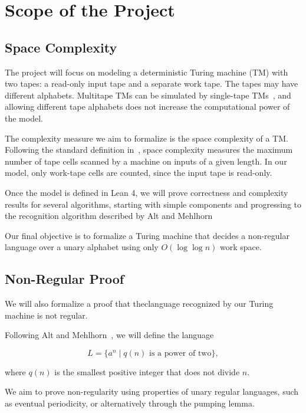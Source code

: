 \documentclass[UTF8]{article}
\begin{document}

\section{Scope of the Project}


\subsection{Space Complexity}
The project will focus on modeling a deterministic
Turing machine (TM) with two tapes: a read-only
input tape and a separate work tape. The tapes
may have different alphabets. Multitape TMs can
be simulated by single-tape TMs~\cite{Intro-TOC-Sipser-1996},
and allowing different tape alphabets does not
increase the computational power of the model.

The complexity measure we aim to formalize is
the space complexity of a TM. Following the
standard definition in~\cite{Intro-TOC-Sipser-1996}, space
complexity measures the maximum number of tape
cells scanned by a machine on inputs of a given
length. In our model, only work-tape cells are
counted, since the input tape is read-only.

Once the model is defined in Lean 4, we will
prove correctness and complexity results for
several algorithms, starting with simple
components and progressing to the recognition
algorithm described by Alt and
Mehlhorn~\cite{Lang-OneSymbAlph-LogLogn-HM-1975}

Our final objective is to formalize a Turing
machine that decides a non-regular language
over a unary alphabet using only
$O(\log\log n)$ work space. \\


\subsection{Non-Regular Proof}

We will also formalize a proof that theclanguage recognized by our Turing machine is not regular.

Following Alt and Mehlhorn~\cite{Lang-OneSymbAlph-LogLogn-HM-1975},
we will define the language

\[
L = \{a^n \mid q(n) \text{ is a power of two}\},
\]

where $q(n)$ is the smallest positive integer that does
not divide $n$.

We aim to prove non-regularity using properties of unary
regular languages, such as eventual periodicity, or
alternatively through the pumping lemma.
\end{document}
